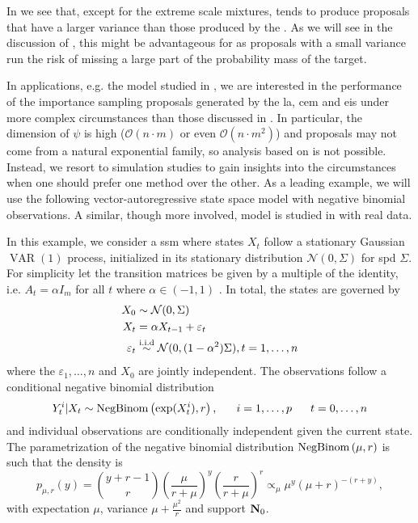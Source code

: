 In  we see that, except for the extreme scale mixtures, \aeis tends to produce proposals that have a larger variance than those produced by the \acem. As we will see in the discussion of , this might be advantageous for \aeis as proposals with a small variance run the risk of missing a large part of the probability mass of the target. 

In applications, e.g. the model studied in , we are interested in the performance of the importance sampling proposals generated by the \gls{la}, \gls{cem} and \gls{eis} under more complex circumstances than those discussed in . In particular, the dimension of $\psi$ is high ($\mathcal O(n \cdot m)$ or even $\mathcal O(n \cdot m^{2})$) and proposals may not come from a natural exponential family, so analysis based on  is not possible. Instead, we resort to simulation studies to gain insights into the circumstances when one should prefer one method over the other.
As a leading example, we will use the following vector-autoregressive state space model with negative binomial observations. A similar, though more involved, model is studied in  with real data.

\begin{example}
    \label{ex:negbinom-ar1}
    In this example, we consider a \gls{ssm} where states $X_{t}$ follow a stationary Gaussian $\operatorname{VAR}(1)$ process, initialized in its stationary distribution $\mathcal N(0,\Sigma)$ for \acrshort{spd} $\Sigma$. For simplicity let the transition matrices be given by a multiple of the identity, i.e. $A_{t} = \alpha I_{m}$ for all $t$ where $\alpha \in (-1, 1)$ . 
    In total, the states are governed by
    \begin{align*}
    X_{0} &\sim \mathcal N(0,\Sigma) \\
    X_{t} &= \alpha X_{t - 1} + \varepsilon_{t}\\
    \varepsilon_t &\stackrel{\text{i.i.d}}{\sim} \mathcal N(0, (1 - \alpha^{2})\Sigma), t = 1, \dots, n
    \end{align*}
    where the $\varepsilon_{1}, \dots, n$ and $X_{0}$ are jointly independent. The observations follow a conditional negative binomial distribution 
    $$
    Y^{i}_{t} | X_{t} \sim \operatorname{NegBinom} \left( \exp(X^{i}_{t}), r \right), \phantom{and} i = 1, \dots, p \phantom{and} t = 0, \dots, n
    $$
    and individual observations are conditionally independent given the current state. The parametrization of the negative binomial distribution $\operatorname{NegBinom} \left( \mu, r \right)$ is such that the density is
    $$
        p_{\mu, r}(y) = \binom{y + r - 1}{r} \left( \frac{\mu}{r + \mu} \right)^{y} \left( \frac{r}{r + \mu} \right)^{r} \propto_{\mu} \mu^{y} (\mu + r)^{-(r + y)},
    $$
    with expectation $\mu$, variance $\mu + \frac{\mu^{2}}{r}$ and support $\mathbf N_{0}$. 
\end{example}

